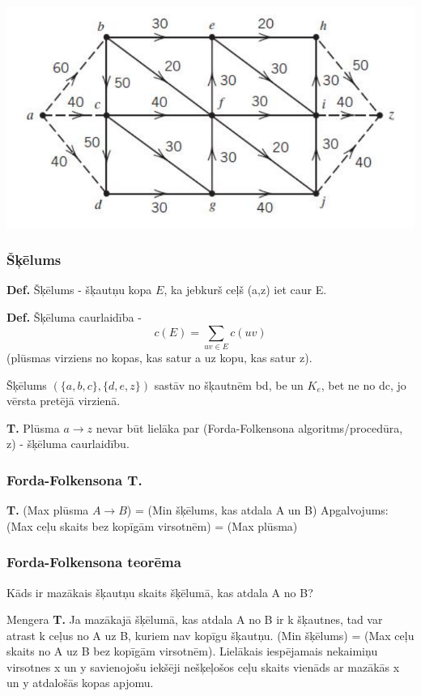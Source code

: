 \documentclass{article}
\begin{document}
\begin{center}
\includegraphics[width=0.5\linewidth]{network_extension-1}
\end{center}

\subsubsection{Šķēlums}

\textbf{Def.}  Šķēlums - šķautņu kopa $E$, ka jebkurš ceļš (a,z) iet caur E.

\textbf{Def.} Šķēluma caurlaidība - \begin{equation}c(E ) = \sum_{uv \in E}{c(uv)}\end{equation} (plūsmas virziens no kopas, kas satur a uz kopu, kas satur z).

Šķēlums $(\{a, b, c\}, \{d, e, z\})$ sastāv no šķautnēm bd, be un $K_e$, bet ne no dc, jo vērsta pretējā virzienā.

\textbf{T. } Plūsma $a \to z$ nevar būt lielāka par (Forda-Folkensona algoritms/procedūra, z) - šķēluma caurlaidību.

\subsubsection{Forda-Folkensona T.}

\textbf{T. }(Max plūsma $A \to B$) = (Min šķēlums, kas atdala A un B)
Apgalvojums: (Max ceļu skaits bez kopīgām virsotnēm) = (Max plūsma)
\subsubsection{Forda-Folkensona teorēma}

Kāds ir mazākais šķautņu skaits šķēlumā, kas atdala A no B?

Mengera \textbf{T. } Ja mazākajā šķēlumā, kas atdala A no B ir k šķautnes, tad var atrast k ceļus no A uz B, kuriem nav kopīgu šķautņu.  (Min šķēlums) = (Max ceļu skaits no A uz B bez kopīgām virsotnēm). Lielākais iespējamais nekaimiņu virsotnes x un y savienojošu iekšēji nešķeļošos ceļu skaits vienāds ar mazākās x un y atdalošās kopas apjomu.
\end{document}
